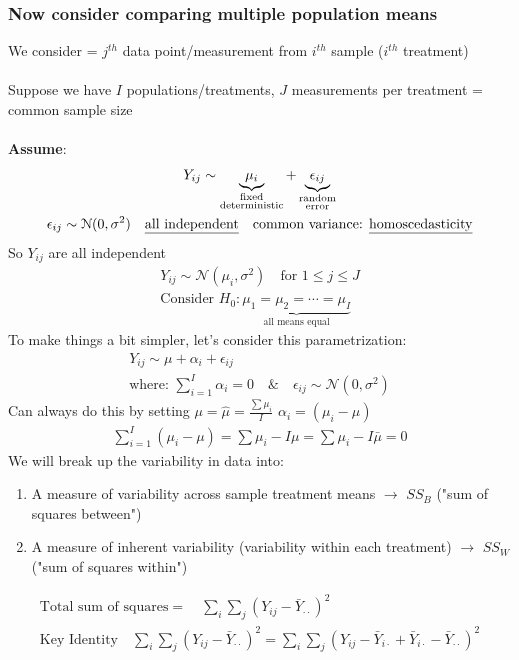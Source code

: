 \subsubsection*{Now consider comparing multiple population means}
We consider  = $j^{th}$ data point/measurement from $i^{th}$ sample ($i^{th}$ treatment)\\\\
Suppose we have $I$ populations/treatments, $J$ measurements per treatment = common sample size\\\\
\textbf{Assume}:
\begin{gather*}
	Y_{ij} \sim \underbrace{\mu_i}_{\substack{\text{fixed} \\ \text{deterministic}}} + \underbrace{\epsilon_{ij}}_{\substack{\text{random} \\ \text{error}}}\\
	\epsilon_{ij} \sim \mathcal{N}(0, \sigma^2) \quad \text{\underline{all independent}} \quad \text{common variance: \underline{homoscedasticity}}
\end{gather*}
So $Y_{ij}$ are all independent
\begin{gather*}
	Y_{ij} \sim \mathcal{N}(\mu_i, \sigma^2) \quad \text{for } 1 \leq j \leq J\\
	\text{Consider } H_0 : \underbrace{\mu_1 = \mu_2 = \cdots = \mu_I}_{\text{all means equal}}
\end{gather*}
To make things a bit simpler, let's consider this parametrization:
\begin{gather*}
	Y_{ij} \sim \mu + \alpha_i + \epsilon_{ij}\\
	\text{where: } \sum_{i=1}^I \alpha_i = 0 \quad \& \quad  \epsilon_{ij} \sim \mathcal{N}(0, \sigma^2)
\end{gather*}
Can always do this by setting $\boxed{\mu = \hat{\mu} = \frac{\sum \mu_i}{I}}$ \quad $\alpha_i = (\mu_i - \mu)$
\begin{gather*}
	\sum_{i=1}^I (\mu_i - \mu) = \sum \mu_i - I \mu = \sum \mu_i - I \bar{\mu}= 0
\end{gather*}
We will break up the variability in data into: 
\begin{enumerate}[label=\protect\circled{\arabic*}]
	\item A measure of variability across sample treatment means $\rightarrow$ $SS_B$ ("sum of squares between")
	\item A measure of inherent variability (variability within each treatment) $\rightarrow$ $SS_W$ ("sum of squares within")
\end{enumerate}
\begin{gather*}
	\text{Total sum of squares} = \quad \sum_i \sum_j (Y_{ij} - \bar{Y}_{\cdot \cdot})^2\\
	\text{Key Identity} \quad \sum_i \sum_j (Y_{ij} - \bar{Y}_{\cdot \cdot})^2 = \sum_i \sum_j (Y_{ij} - \bar{Y}_{i\cdot} + \bar{Y}_{i\cdot} - \bar{Y}_{\cdot \cdot})^2\\
\end{gather*}